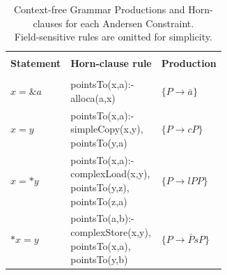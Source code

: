 \begin{table}
    \begin{center}
        \caption{Context-free Grammar Productions and Horn-clauses for each Andersen Constraint.\\Field-sensitive rules are omitted for simplicity.}
        \label{tab:cfl-ander2}
        \begin{tabularx}{1\textwidth} {X|X|X}
            \hline                                                                   \\
            \textbf{Statement} & \textbf{Horn-clause rule}     & \textbf{Production} \\
            \hline                                                                   \\
            $x = \&a$          & \makecell[cl]{pointsTo(x,a):-                       \\\hspace{1em} alloca(a,x)} & $\{P\rightarrow \bar{a}\}$                          \\\hline
            $x = y$            & \makecell[cl]{pointsTo(x,a):-                       \\\hspace{1em} simpleCopy(x,y),\\\hspace{1em} pointsTo(y,a)} &$\{P\rightarrow cP\}$    \\\hline
            $x = *y$           & \makecell[cl]{pointsTo(x,a):-                       \\\hspace{1em} complexLoad(x,y),\\\hspace{1em} pointsTo(y,z),\\\hspace{1em} pointsTo(z,a)}    & $\{P\rightarrow lPP\}$                          \\\hline
            $*x = y$           & \makecell[cl]{pointsTo(a,b):-                       \\\hspace{1em} complexStore(x,y),\\\hspace{1em} pointsTo(x,a),\\\hspace{1em} pointsTo(y,b)}   & $\{P\rightarrow \bar{P}sP\}$                          \\
        \end{tabularx}
    \end{center}
\end{table}
